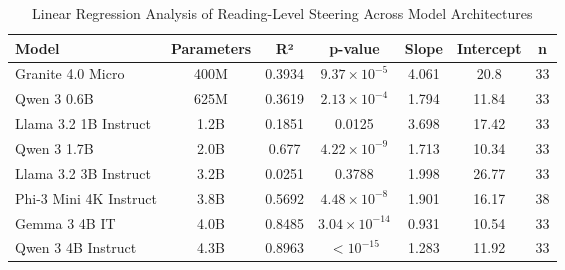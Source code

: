 \begin{table}[h]
\centering
\caption{Linear Regression Analysis of Reading-Level Steering Across Model Architectures}
\label{tab:model_comparison}
\begin{tabular}{lcccccc}
\hline
\textbf{Model} & \textbf{Parameters} & \textbf{R²} & \textbf{p-value} & \textbf{Slope} & \textbf{Intercept} & \textbf{n} \\
\hline
Granite 4.0 Micro & 400M & 0.3934 & $9.37 \times 10^{-5}$ & 4.061 & 20.8 & 33 \\
Qwen 3 0.6B & 625M & 0.3619 & $2.13 \times 10^{-4}$ & 1.794 & 11.84 & 33 \\
Llama 3.2 1B Instruct & 1.2B & 0.1851 & 0.0125 & 3.698 & 17.42 & 33 \\
Qwen 3 1.7B & 2.0B & 0.677 & $4.22 \times 10^{-9}$ & 1.713 & 10.34 & 33 \\
Llama 3.2 3B Instruct & 3.2B & 0.0251 & 0.3788 & 1.998 & 26.77 & 33 \\
Phi-3 Mini 4K Instruct & 3.8B & 0.5692 & $4.48 \times 10^{-8}$ & 1.901 & 16.17 & 38 \\
Gemma 3 4B IT & 4.0B & 0.8485 & $3.04 \times 10^{-14}$ & 0.931 & 10.54 & 33 \\
Qwen 3 4B Instruct & 4.3B & 0.8963 & $<10^{-15}$ & 1.283 & 11.92 & 33 \\
\hline
\end{tabular}
\end{table}
